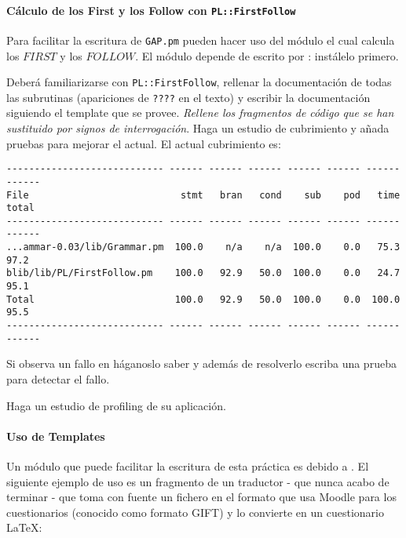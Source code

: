 \paragraph{Cálculo de los First y los Follow con {\tt PL::FirstFollow}}

Para facilitar la escritura de \verb|GAP.pm| pueden hacer uso 
del módulo 
el cual calcula los $FIRST$ y los $FOLLOW$. El módulo 
depende de 
escrito por 
: instálelo primero.

Deberá familiarizarse con {\tt PL::FirstFollow}, rellenar la
documentación de todas las subrutinas (apariciones de \verb|????| en el texto)
y escribir la documentación siguiendo el template que se provee. 
\emph{Rellene los fragmentos de código que se han sustituido por 
signos de interrogación}.
Haga un estudio de cubrimiento
y añada pruebas para mejorar el actual. El actual cubrimiento es:
\begin{verbatim}
---------------------------- ------ ------ ------ ------ ------ ------ ------
File                           stmt   bran   cond    sub    pod   time  total
---------------------------- ------ ------ ------ ------ ------ ------ ------
...ammar-0.03/lib/Grammar.pm  100.0    n/a    n/a  100.0    0.0   75.3   97.2
blib/lib/PL/FirstFollow.pm    100.0   92.9   50.0  100.0    0.0   24.7   95.1
Total                         100.0   92.9   50.0  100.0    0.0  100.0   95.5
---------------------------- ------ ------ ------ ------ ------ ------ ------
\end{verbatim}
Si observa un fallo en  háganoslo saber y
además de resolverlo escriba una prueba para detectar el fallo.

Haga un estudio de profiling de su aplicación.
\paragraph{Uso de Templates}

Un módulo que puede facilitar la escritura de esta práctica 
es 
debido a 
.
El siguiente ejemplo de uso es un fragmento de  un traductor - que nunca acabo de terminar
- que toma con fuente 
un fichero en el formato que usa Moodle para los cuestionarios (conocido como 
formato GIFT) y lo convierte en un cuestionario \LaTeX{}:


